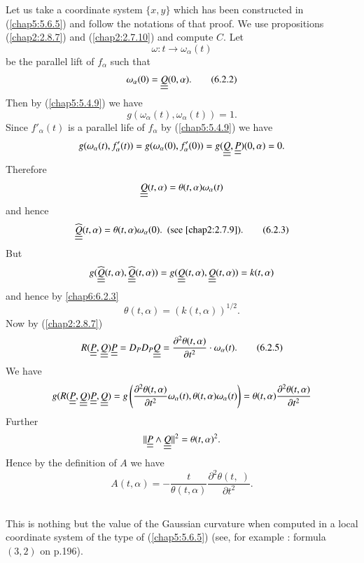 Let us take a coordinate system $\{x,y\}$ which has been constructed
in (\ref{chap5:5.6.5}) and follow the notations of that proof. We use
propositions (\ref{chap2:2.8.7}) and (\ref{chap2:2.7.10}) and compute
$C$. Let
\begin{equation*}
\omega:t\to \omega_{\alpha}(t)\tag{6.2.1}\label{chap6:6.2.1}
\end{equation*}
be the parallel lift of $f_{\alpha}$ such that
\begin{equation*}
\omega_{\alpha}(0)=\underline{\underline{Q}}(0,\alpha).\tag{6.2.2}\label{chap6:6.2.2}
\end{equation*}
Then by (\ref{chap5:5.4.9}) we have
$$
g(\omega_{\alpha}(t), \omega_{\alpha}(t))=1.
$$
Since $f'_{\alpha}(t)$ is a parallel life of $f_{\alpha}$ by
(\ref{chap5:5.4.9}) we have
$$
g(\omega_{\alpha}(t),f'_{\alpha}(t))=g(\omega_{\alpha}(0),f'_{\alpha}(0))=g(\underline{\underline{Q}},\underline{\underline{P}})(0,\alpha)=0. 
$$
Therefore
$$
\underline{\underline{Q}}(t,\alpha)=\theta(t,\alpha)\omega_{\alpha}(t)
$$
and hence
\begin{equation*}
\widehat{\underline{\underline{Q}}}(t,\alpha)=\theta(t,\alpha)\omega_{\alpha}(0). \text{ 
  \ (see \eqref{chap2:2.7.9}).}\tag{6.2.3}\label{chap6:6.2.3} 
\end{equation*}
But\pageoriginale
$$
g(\widehat{\underline{\underline{Q}}}(t,\alpha),\widehat{\underline{\underline{Q}}}(t,\alpha))=g(\underline{\underline{Q}}(t,\alpha),\underline{\underline{Q}}(t,\alpha))=k(t,\alpha)
$$
and hence by \eqref{chap6:6.2.3}
\begin{equation*}
\theta(t,\alpha)=(k(t,\alpha))^{1/2}.\tag{6.2.4}\label{chap6:6.2.4}
\end{equation*}
Now by (\ref{chap2:2.8.7})
\begin{equation*}
R(\underline{\underline{P}},\underline{\underline{Q}})\underline{\underline{P}}=D_{P}D_{P}\underline{\underline{Q}}=\frac{\partial^{2}\theta(t,\alpha)}{\partial 
  t^{2}}\cdot \omega_{\alpha}(t).\tag{6.2.5}\label{chap6:6.2.5}
\end{equation*}
We have
$$
g(R(\underline{\underline{P}},\underline{\underline{Q}})\underline{\underline{P}},\underline{\underline{Q}}) =
g\left(\frac{\partial^{2}\theta(t,\alpha)}{\partial 
  t^{2}}\omega_{\alpha}(t),
\theta(t,\alpha)\omega_{\alpha}(t)\right) =
\theta(t,\alpha)\frac{\partial^{2} \theta(t,\alpha)}{\partial t^{2}}  
$$
Further
$$
||\underline{\underline{P}}\wedge\underline{\underline{Q}}||^{2}=\theta(t,\alpha)^{2}.
$$
Hence by the definition of $A$ we have
\begin{equation*}
A(t,\alpha)=-\frac{t}{\theta(t,\alpha)}
\frac{\partial^{2}\theta(t,\;)}{\partial
  t^{2}}.\tag{6.2.6}\label{chap6:6.2.6} 
\end{equation*}

\setcounter{subsection}{6}
\subsection{}\label{chap6:6.2.7}
This is nothing but the value of the Gaussian curvature when computed
in a local coordinate system of the type of (\ref{chap5:5.6.5}) (see,
for example \cite{31}: formula $(3,2)$ on p.196).

